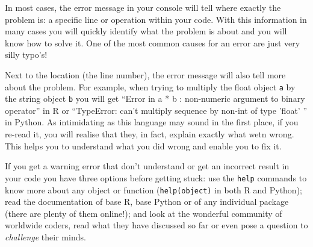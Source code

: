 In most cases, the error message in your console will tell where exactly the problem is: a specific line or operation within your code. With this information in many cases you will quickly identify what the problem is about and you will know how to solve it. One of the most common causes for an error are just very silly typo's!

Next to the location (the line number), the error message will also tell more about the problem. For example, when trying to multiply the float object \texttt{a} by the string object \texttt{b} you will get ``Error in a * b : non-numeric argument to binary operator'' in R or ``TypeError: can't multiply sequence by non-int of type 'float' '' in Python. As intimidating as this language may sound in the first place, if you re-read it, you will realise that they, in fact, explain exactly what wetn wrong. This helps you to understand what you did wrong and enable you to fix it. 




If you get a warning error that don't understand or get an incorrect result in your code you have three options before getting stuck: use the \texttt{help} commands to know more about any object or function (\verb|help(object)| in both R and  Python); read the documentation of base R, base Python or of any individual package (there are plenty of them online!); and look at the wonderful community of worldwide coders, read what they have discussed so far or even pose a question to \textit{challenge} their minds.


